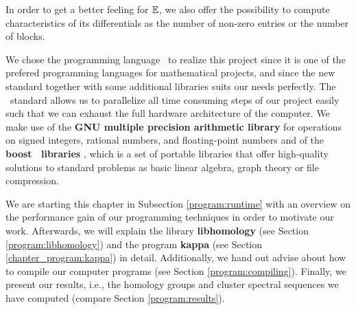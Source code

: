 In order to get a better feeling for $\mathbb E$, we also offer the possibility to compute characteristics of its differentials as the number of non-zero entries or the number of blocks.

We chose the programming language \cppeleven\ to realize this project since it is one of the prefered programming languages for mathematical projects, and since the new standard together with some additional libraries suits our needs perfectly.
The \cppeleven\ standard allows us to parallelize all time consuming steps of our project easily
such that we can exhaust the full hardware architecture of the computer.
We make use of the {\bf GNU multiple precision arithmetic library} \cite{GMP} for operations on signed integers, rational numbers, and floating-point numbers and
of the {\bf boost \cpp\ libraries} \cite{boost}, which is a set of portable libraries that offer high-quality solutions to standard problems as basic linear algebra, graph theory or file compression.

We are starting this chapter in Subsection \ref{program:runtime} with an overview on the performance gain of our programming techniques in order to motivate our work.
Afterwards, we will explain the library {\bf libhomology} (see Section \ref{program:libhomology}) and the program {\bf kappa} (see Section \ref{chapter_program:kappa}) in detail.
Additionally, we hand out advise about how to compile our computer programs (see Section \ref{program:compiling}).
Finally, we present our results, i.e., the homology groups and cluster spectral sequences we have computed (compare Section \ref{program:results}).







\nocite{Austern2003}
\nocite{Josuttis2012}
\nocite{Stroustrup2013}
